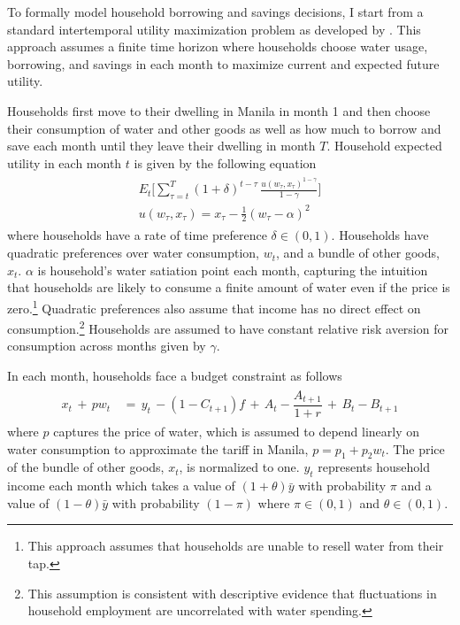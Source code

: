 \documentclass[12pt,table]{article}
\begin{document}
To formally model household borrowing and savings decisions, I start from a standard intertemporal utility maximization problem as developed by \cite{deaton1991saving}.  This approach assumes a finite time horizon where households choose water usage, borrowing, and savings in each month to maximize current and expected future utility.  

Households first move to their dwelling in Manila in month 1 and then choose their consumption of water and other goods as well as how much to borrow and save each month until they leave their dwelling in month $T$.  Household expected utility in each month $t$ is given by the following equation
\begin{align}\label{eq:u}
\begin{split}
E_t \Big[ \sum_{\tau = t}^{T} (1+\delta)^{t-\tau} \,\frac{u(w_{\tau},x_{\tau})^{1-\gamma}}{1-\gamma}   \Big]\\
u(w_{\tau},x_{\tau}) =  x_{\tau} -  \frac{1}{2} (w_{\tau} - \alpha)^2
\end{split} 
\end{align}
where households have a rate of time preference $\delta \in (0,1)$.  Households have quadratic preferences over water consumption, $w_{t}$, and a bundle of other goods, $x_{t}$.  $\alpha$ is household's water satiation point each month, capturing the intuition that households are likely to consume a finite amount of water even if the price is zero.\footnote{This approach assumes that households are unable to resell water from their tap.}  Quadratic preferences also assume that income has no direct effect on consumption.\footnote{This assumption is consistent with descriptive evidence that fluctuations in household employment are uncorrelated with water spending.}  Households are assumed to have constant relative risk aversion for consumption across months given by $\gamma$.


In each month, households face a budget constraint as follows
\begin{align}\label{eq:bc}
\begin{split}
x_t \, + \, p w_t \, &= \, y_t \, - (1-C_{t+1})f  \, + \,  A_t  - \dfrac{A_{t+1}}{1+r}   \, + \,  B_t - B_{t+1} 
\end{split}
\end{align}
where $p$ captures the price of water, which is assumed to depend linearly on water consumption to approximate the tariff in Manila, $p=p_1+p_2w_t$.   The price of the bundle of other goods, $x_t$, is normalized to one.  $y_t$ represents household income each month which takes a value of $(1+\theta)\bar{y}$ with probability $\pi$ and a value of $(1-\theta)\bar{y}$ with probability $(1-\pi)$ where $\pi \in (0,1)$ and $\theta  \in (0,1)$.  
\end{document}
